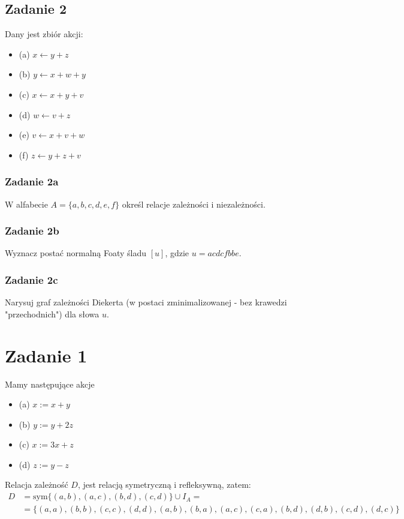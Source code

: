 \documentclass[11pt]{article}
\begin{document}
\subsection*{Zadanie 2}
\label{sec:org870d3c3}
Dany jest zbiór akcji:

\begin{itemize}
\item (a) \(x \leftarrow y + z\)
\item (b) \(y \leftarrow x + w +y\)
\item (c) \(x \leftarrow x + y + v\)
\item (d) \(w \leftarrow v + z\)
\item (e) \(v \leftarrow x + v + w\)
\item (f) \(z \leftarrow y + z+ v\)
\end{itemize}
\subsubsection*{Zadanie 2a}
\label{sec:org80aa92a}
W alfabecie \(A = \{ a, b, c, d, e, f \}\) określ relacje zależności i niezależności.
\subsubsection*{Zadanie 2b}
\label{sec:orgbda5a46}
Wyznacz postać normalną Foaty śladu \([u]\), gdzie \(u = acdcfbbe\).
\subsubsection*{Zadanie 2c}
\label{sec:org830e540}
Narysuj graf zależności Diekerta (w postaci zminimalizowanej - bez krawedzi "przechodnich") dla słowa \(u\).
\section*{Zadanie 1}
\label{sec:orgfefbdec}
Mamy następujące akcje

\begin{itemize}
\item (a) \(x := x + y\)
\item (b) \(y := y + 2z\)
\item (c) \(x := 3x + z\)
\item (d) \(z := y - z\)
\end{itemize}

Relacja zależność \(D\), jest relacją symetryczną i refleksywną, zatem:
\begin{align*}
D &= \text{sym} \{ (a,b), (a,c), (b,d), (c,d) \} \cup I_A = \\
&= \{(a,a), (b,b), (c, c), (d,d), (a, b), (b, a), (a, c), (c,a), (b, d), (d, b), (c, d), (d, c)\}
\end{align*}
\end{document}
